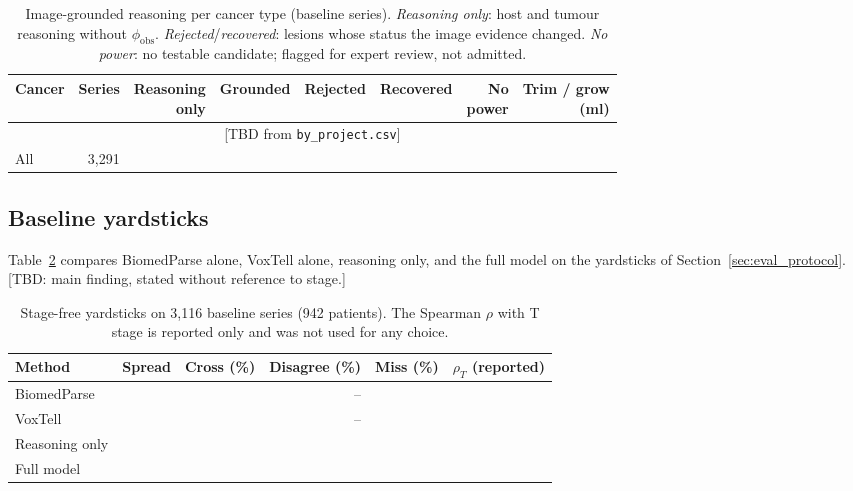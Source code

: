 \documentclass[fleqn,10pt]{olplainarticle}
\begin{document}
\begin{table}[t]
\centering\small
\caption{Image-grounded reasoning per cancer type (baseline series). \emph{Reasoning only}: host and tumour
reasoning without $\phi_{\mathrm{obs}}$. \emph{Rejected}/\emph{recovered}: lesions whose status the image evidence
changed. \emph{No power}: no testable candidate; flagged for expert review, not admitted.}
\label{tab:r2_by_type}
\setlength{\tabcolsep}{4pt}\footnotesize
\begin{tabular}{lrrrrrrr}
\hline
Cancer & Series & \shortstack{Reasoning\\only} & Grounded & Rejected & Recovered & \shortstack{No\\power} & \shortstack{Trim / grow\\(ml)}\\
\hline
\multicolumn{8}{c}{[TBD from \texttt{by\_project.csv}]}\\
\hline
All & 3{,}291 & & & & & & \\
\hline
\end{tabular}
\end{table}

\subsection{Baseline yardsticks}
\label{sec:results_yardsticks}
Table~\ref{tab:yardsticks} compares BiomedParse alone, VoxTell alone, reasoning only, and the full model on the
yardsticks of Section~\ref{sec:eval_protocol}. [TBD: main finding, stated without reference to stage.]

\begin{table}[t]
\centering\small
\caption{Stage-free yardsticks on 3{,}116 baseline series (942 patients). The Spearman $\rho$ with T stage is reported
only and was not used for any choice.}
\label{tab:yardsticks}
\begin{tabular}{lrrrrr}
\hline
Method & Spread & Cross (\%) & Disagree (\%) & Miss (\%) & $\rho_T$ (reported)\\
\hline
BiomedParse & & & -- & & \\
VoxTell & & & -- & & \\
Reasoning only & & & & & \\
Full model & & & & & \\
\hline
\end{tabular}
\end{table}
\end{document}
